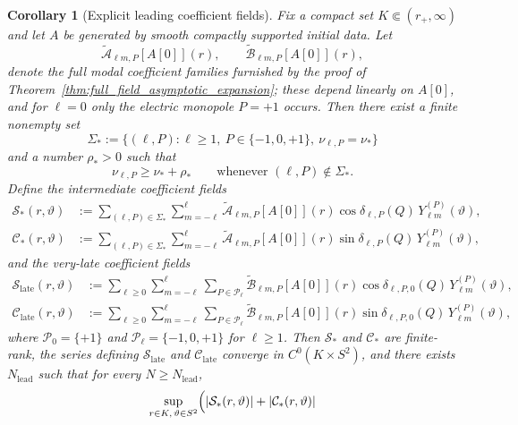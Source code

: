\documentclass[12pt]{article}
\numberwithin{equation}{section}
\theoremstyle{plain}
\newtheorem{corollary}[theorem]{Corollary}
\theoremstyle{definition}
\theoremstyle{remark}
\newcommand{\cC}{\mathcal C}
\newcommand{\cS}{\mathcal S}
\newcommand{\abs}[1]{\left|#1\right|}
\begin{document}
\begin{corollary}[Explicit leading coefficient fields]\label{cor:explicit_leading_coefficients}
Fix a compact set $K\Subset(r_+,\infty)$ and let $A$ be generated by smooth compactly supported initial data.  Let
\[
   \widetilde{\mathcal A}_{\ell m,P}[A[0]](r),
   \qquad
   \widetilde{\mathcal B}_{\ell m,P}[A[0]](r),
\]
denote the full modal coefficient families furnished by the proof of Theorem~\ref{thm:full_field_asymptotic_expansion}; these depend linearly on $A[0]$, and for $\ell=0$ only the electric monopole $P=+1$ occurs.  Then there exist a finite nonempty set
\[
   \Sigma_*:=\{(\ell,P):\ell\ge1,\ P\in\{-1,0,+1\},\ \nu_{\ell,P}=\nu_*\}
\]
and a number $\rho_*>0$ such that
\[
   \nu_{\ell,P}\ge\nu_*+\rho_*
   \qquad
   \text{whenever }(\ell,P)\notin\Sigma_*.
\]
Define the intermediate coefficient fields
\begin{align}
   \cS_*(r,\vartheta)
   &:=
   \sum_{(\ell,P)\in\Sigma_*}\sum_{m=-\ell}^{\ell}
   \widetilde{\mathcal A}_{\ell m,P}[A[0]](r)
   \cos\delta_{\ell,P}(Q)\,
   Y_{\ell m}^{(P)}(\vartheta),
   \label{eq:intro_explicit_Sstar}
   \\
   \cC_*(r,\vartheta)
   &:=
   \sum_{(\ell,P)\in\Sigma_*}\sum_{m=-\ell}^{\ell}
   \widetilde{\mathcal A}_{\ell m,P}[A[0]](r)
   \sin\delta_{\ell,P}(Q)\,
   Y_{\ell m}^{(P)}(\vartheta),
   \label{eq:intro_explicit_Cstar}
\end{align}
and the very-late coefficient fields
\begin{align}
   \cS_{\mathrm{late}}(r,\vartheta)
   &:=
   \sum_{\ell\ge0}\sum_{m=-\ell}^{\ell}\sum_{P\in\mathcal P_\ell}
   \widetilde{\mathcal B}_{\ell m,P}[A[0]](r)
   \cos\delta_{\ell,P,0}(Q)\,
   Y_{\ell m}^{(P)}(\vartheta),
   \label{eq:intro_explicit_Slate}
   \\
   \cC_{\mathrm{late}}(r,\vartheta)
   &:=
   \sum_{\ell\ge0}\sum_{m=-\ell}^{\ell}\sum_{P\in\mathcal P_\ell}
   \widetilde{\mathcal B}_{\ell m,P}[A[0]](r)
   \sin\delta_{\ell,P,0}(Q)\,
   Y_{\ell m}^{(P)}(\vartheta),
   \label{eq:intro_explicit_Clate}
\end{align}
where $\mathcal P_0=\{+1\}$ and $\mathcal P_\ell=\{-1,0,+1\}$ for $\ell\ge1$.  Then $\cS_*$ and $\cC_*$ are finite-rank, the series defining $\cS_{\mathrm{late}}$ and $\cC_{\mathrm{late}}$ converge in $C^0(K\times S^2)$, and there exists $N_{\mathrm{lead}}$ such that for every $N\ge N_{\mathrm{lead}}$,
\begin{align}
   \sup_{r\in K,\,\vartheta\in S^2}
   \Bigl(
      \abs{\cS_*(r,\vartheta)}
      +\abs{\cC_*(r,\vartheta)}

\end{align}
\end{corollary}
\end{document}
